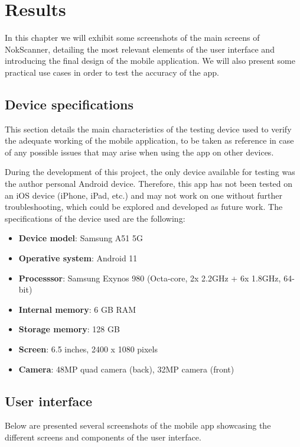 \chapter{Results}
\label{chapter7}

In this chapter we will exhibit some screenshots of the main screens of NokScanner, detailing the most relevant elements of the user interface and introducing the final design of the mobile application. We will also present some practical use cases in order to test the accuracy of the app.

\section{Device specifications}

This section details the main characteristics of the testing device used to verify the adequate working of the mobile application, to be taken as reference in case of any possible issues that may arise when using the app on other devices.

During the development of this project, the only device available for testing was the author personal Android device. Therefore, this app has not been tested on an iOS device (iPhone, iPad, etc.) and may not work on one without further troubleshooting, which could be explored and developed as future work. The specifications of the device used are the following:

\begin{itemize}
\item \textbf{Device model}: Samsung A51 5G
\item \textbf{Operative system}: Android 11
\item \textbf{Processsor}: Samsung Exynos 980 (Octa-core, 2x 2.2GHz + 6x 1.8GHz, 64-bit)
\item \textbf{Internal memory}: 6 GB RAM
\item \textbf{Storage memory}: 128 GB
\item \textbf{Screen}: 6.5 inches, 2400 x 1080 pixels
\item \textbf{Camera}: 48MP quad camera (back), 32MP camera (front)
\end{itemize}

\section{User interface}

Below are presented several screenshots of the mobile app showcasing the different screens and components of the user interface.

